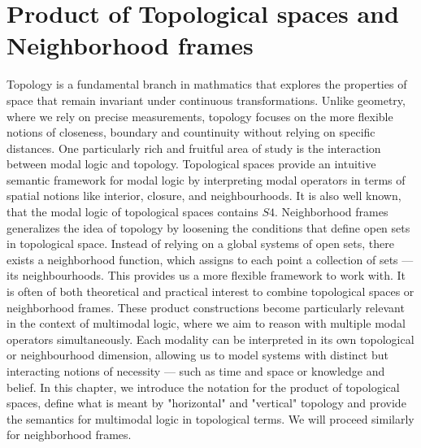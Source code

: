 \documentclass[12pt, a4paper]{scrartcl}
\begin{document}
\section{Product of Topological spaces and Neighborhood frames}
Topology is a fundamental branch in mathmatics that explores the properties of space that remain invariant under continuous transformations. Unlike geometry,
where we rely on precise measurements, topology focuses on the more flexible notions of closeness, boundary and countinuity without
relying on specific distances. 
\newline
One particularly rich and fruitful area of study is the interaction between modal logic and topology. 
Topological spaces provide an intuitive semantic framework for modal logic by interpreting modal operators in terms of spatial notions like interior, closure, and neighbourhoods. 
It is also well known, that the modal logic of topological spaces contains $S4$.
\newline
Neighborhood frames generalizes the idea of topology by loosening the conditions that define open sets in topological space.
Instead of relying on a global systems of open sets, there exists a neighborhood function, which assigns to each point a collection of sets — its neighbourhoods.
This provides us a more flexible framework to work with.
\newline
It is often of both theoretical and practical interest to combine topological spaces or neighborhood frames.  
These product constructions become particularly relevant in the context of multimodal logic, where we aim to reason with multiple modal operators simultaneously.
Each modality can be interpreted in its own topological or neighbourhood dimension, allowing us to model systems with distinct but interacting notions of necessity — such as time and space or knowledge and belief.
\newline
In this chapter, we introduce the notation for the product of topological spaces, define what is meant by "horizontal" and "vertical" topology and provide the semantics for multimodal logic in topological terms. We will proceed similarly for neighborhood frames.
\end{document}
